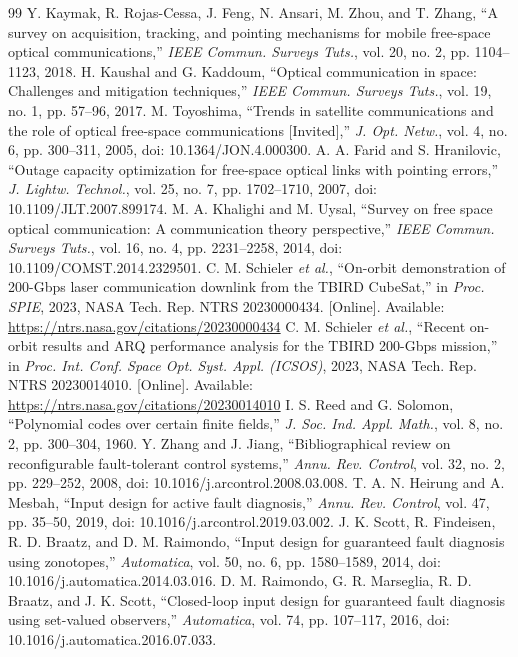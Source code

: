 \documentclass[journal]{IEEEtran}
\begin{document}
\begin{thebibliography}{99}
 Y. Kaymak, R. Rojas-Cessa, J. Feng, N. Ansari, M. Zhou, and T. Zhang, ``A survey on acquisition, tracking, and pointing mechanisms for mobile free-space optical communications,'' \emph{IEEE Commun. Surveys Tuts.}, vol. 20, no. 2, pp. 1104--1123, 2018.
 H. Kaushal and G. Kaddoum, ``Optical communication in space: Challenges and mitigation techniques,'' \emph{IEEE Commun. Surveys Tuts.}, vol. 19, no. 1, pp. 57--96, 2017.
 M. Toyoshima, ``Trends in satellite communications and the role of optical free-space communications [Invited],'' \emph{J. Opt. Netw.}, vol. 4, no. 6, pp. 300--311, 2005, doi: 10.1364/JON.4.000300.
 A. A. Farid and S. Hranilovic, ``Outage capacity optimization for free-space optical links with pointing errors,'' \emph{J. Lightw. Technol.}, vol. 25, no. 7, pp. 1702--1710, 2007, doi: 10.1109/JLT.2007.899174.
 M. A. Khalighi and M. Uysal, ``Survey on free space optical communication: A communication theory perspective,'' \emph{IEEE Commun. Surveys Tuts.}, vol. 16, no. 4, pp. 2231--2258, 2014, doi: 10.1109/COMST.2014.2329501.
 C. M. Schieler \emph{et al.}, ``On-orbit demonstration of 200-Gbps laser communication downlink from the TBIRD CubeSat,'' in \emph{Proc. SPIE}, 2023, NASA Tech. Rep. NTRS 20230000434. [Online]. Available: \url{https://ntrs.nasa.gov/citations/20230000434}
 C. M. Schieler \emph{et al.}, ``Recent on-orbit results and ARQ performance analysis for the TBIRD 200-Gbps mission,'' in \emph{Proc. Int. Conf. Space Opt. Syst. Appl. (ICSOS)}, 2023, NASA Tech. Rep. NTRS 20230014010. [Online]. Available: \url{https://ntrs.nasa.gov/citations/20230014010}
 I. S. Reed and G. Solomon, ``Polynomial codes over certain finite fields,'' \emph{J. Soc. Ind. Appl. Math.}, vol. 8, no. 2, pp. 300--304, 1960.
 Y. Zhang and J. Jiang, ``Bibliographical review on reconfigurable fault-tolerant control systems,'' \emph{Annu. Rev. Control}, vol. 32, no. 2, pp. 229--252, 2008, doi: 10.1016/j.arcontrol.2008.03.008.
 T. A. N. Heirung and A. Mesbah, ``Input design for active fault diagnosis,'' \emph{Annu. Rev. Control}, vol. 47, pp. 35--50, 2019, doi: 10.1016/j.arcontrol.2019.03.002.
 J. K. Scott, R. Findeisen, R. D. Braatz, and D. M. Raimondo, ``Input design for guaranteed fault diagnosis using zonotopes,'' \emph{Automatica}, vol. 50, no. 6, pp. 1580--1589, 2014, doi: 10.1016/j.automatica.2014.03.016.
 D. M. Raimondo, G. R. Marseglia, R. D. Braatz, and J. K. Scott, ``Closed-loop input design for guaranteed fault diagnosis using set-valued observers,'' \emph{Automatica}, vol. 74, pp. 107--117, 2016, doi: 10.1016/j.automatica.2016.07.033.
\end{thebibliography}
\end{document}

